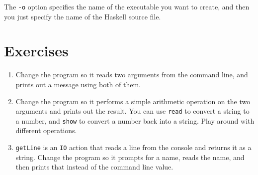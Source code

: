 The \verb|-o| option specifies the name of the executable you want to create, and then you just specify the name of the Haskell source file.
 
\section{Exercises}
 
\begin{enumerate}
	\item Change the program so it reads two arguments from the command line, and prints out a message using both of them.
	\item Change the program so it performs a simple arithmetic operation on the two arguments and prints out the result. You can use \verb|read| to convert a string to a number, and \verb|show| to convert a number back into a string. Play around with different operations.
	\item \verb|getLine| is an \verb|IO| action that reads a line from the console and returns it as a string. Change the program so it prompts for a name, reads the name, and then prints that instead of the command line value.
\end{enumerate}
